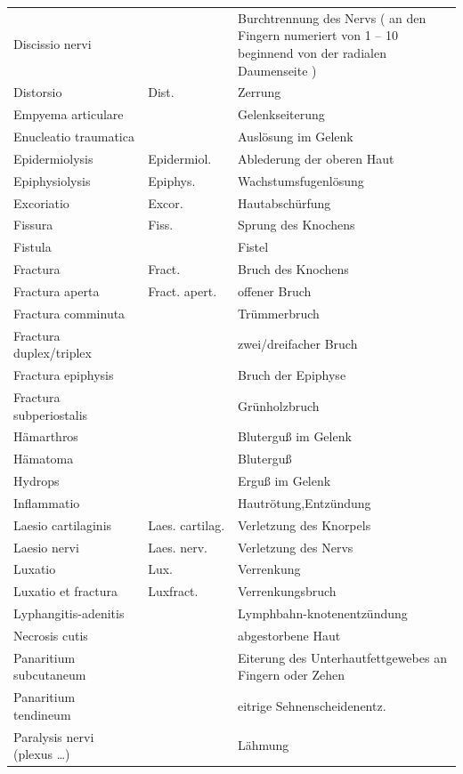 \documentclass[
ngerman,
paper=a4,
asymmetric,
fontsize=10pt,
headings=small,
draft=false,
numbers=noenddot,
bibtotocnumbered,
footnotes=multiple,
]{scrreprt}
\begin{document}
\begin{enumerate}
{\begin{longtable}{p{0.3\linewidth}p{0.2\linewidth}p{0.5\linewidth}}
\\
Discissio nervi  & &	Burchtrennung des Nervs ( an den Fingern numeriert von 1 – 10 beginnend von der radialen Daumenseite )
\\
Distorsio  & Dist. &	Zerrung
\\\addlinespace
Empyema articulare  & &	Gelenkseiterung
\\
Enucleatio traumatica  & &	Auslösung im Gelenk
\\
Epidermiolysis  & Epidermiol. &	Ablederung der oberen Haut
\\
Epiphysiolysis  & Epiphys. &	Wachstumsfugenlösung
\\
Excoriatio  & Excor. &	Hautabschürfung
\\\addlinespace
Fissura &  Fiss. &	Sprung des Knochens
\\
Fistula  & &	Fistel
\\
Fractura  & Fract. &	Bruch des Knochens
\\
Fractura aperta  & Fract. apert. &	offener Bruch
\\
Fractura comminuta  & &	Trümmerbruch
\\
Fractura duplex/triplex  & &	zwei/dreifacher Bruch
\\
Fractura epiphysis  & &	Bruch der Epiphyse
\\
Fractura subperiostalis  & &	Grünholzbruch
\\\addlinespace
Hämarthros  & &	Bluterguß im Gelenk
\\
Hämatoma  & &	Bluterguß
\\
Hydrops  & &	Erguß im Gelenk
\\\addlinespace
Inflammatio  & &	Hautrötung,Entzündung
\\\addlinespace
Laesio cartilaginis  & Laes. cartilag. &	Verletzung des Knorpels
\\
Laesio nervi   & Laes. nerv. &	Verletzung des Nervs
\\
Luxatio   & Lux. &	Verrenkung
\\
Luxatio et fractura  & Luxfract. &	Verrenkungsbruch
\\
Lyphangitis-adenitis  & &	Lymphbahn-knotenentzündung
\\\addlinespace
Necrosis cutis  & &	abgestorbene Haut
\\\addlinespace
Panaritium subcutaneum  & &	Eiterung des Unterhautfettgewebes an Fingern oder Zehen
\\
Panaritium tendineum  & &	eitrige Sehnenscheidenentz.
\\
Paralysis nervi (plexus \ldots)  & &	Lähmung

\end{longtable}}
\end{enumerate}
\end{document}

